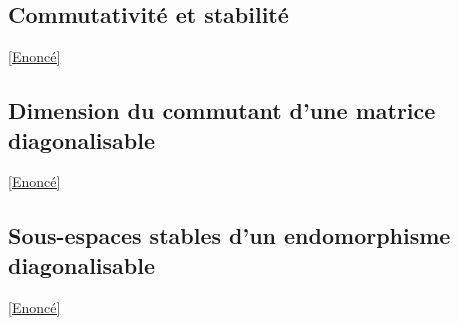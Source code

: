 \documentclass[8pt]{book}
\begin{document}
	\subsection{Commutativité et stabilité}
	\label{Communtativité et stabilité corrigé}
	\textcolor{blue}{\hyperref[Commutativité et stabilité]{[Enoncé]}}\\
	
	\subsection{Dimension du commutant d'une matrice diagonalisable}
	\label{Dimension du commutant d'une matrice diagonalisable corrigé}
	\textcolor{blue}{\hyperref[Dimension du commutant d'une matrice diagonalisable]{[Enoncé]}}\\
	
	\subsection{Sous-espaces stables d'un endomorphisme diagonalisable}
	\label{Sous-espaces stables d'un endomorphisme diagonalisable corrigé}
	\label{dz stable}
	\textcolor{blue}{\hyperref[Sous-espaces stables d'un endomorphisme diagonalisable]{[Enoncé]}}\\
	
\end{document}
